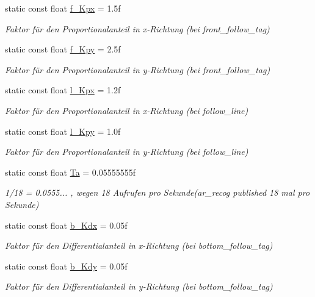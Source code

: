 \begin{DoxyCompactItemize}
static const float \hyperlink{class_cglobal_ae94b927d5fee8ac20eb04add78006959}{f\_\-Kpx} = 1.5f
\begin{DoxyCompactList}\small\item\em Faktor für den Proportionalanteil in x-\/Richtung (bei front\_\-follow\_\-tag) \end{DoxyCompactList}\item 
static const float \hyperlink{class_cglobal_a06a9f451633a82b68760360037b53f64}{f\_\-Kpy} = 2.5f
\begin{DoxyCompactList}\small\item\em Faktor für den Proportionalanteil in y-\/Richtung (bei front\_\-follow\_\-tag) \end{DoxyCompactList}\item 
static const float \hyperlink{class_cglobal_a6c5a5a9fb3c2da5264622c738b326245}{l\_\-Kpx} = 1.2f
\begin{DoxyCompactList}\small\item\em Faktor für den Proportionalanteil in x-\/Richtung (bei follow\_\-line) \end{DoxyCompactList}\item 
static const float \hyperlink{class_cglobal_a458383235afe73b333a22a5edcc3eed6}{l\_\-Kpy} = 1.0f
\begin{DoxyCompactList}\small\item\em Faktor für den Proportionalanteil in y-\/Richtung (bei follow\_\-line) \end{DoxyCompactList}\item 
static const float \hyperlink{class_cglobal_a7a599bd2c2f4400e3b7f8f98e1f293fe}{Ta} = 0.05555555f
\begin{DoxyCompactList}\small\item\em 1/18 = 0.0555... , wegen 18 Aufrufen pro Sekunde(ar\_\-recog published 18 mal pro Sekunde) \end{DoxyCompactList}\item 
static const float \hyperlink{class_cglobal_a78bc2eecbfcfe436e141e9e06b7d6f10}{b\_\-Kdx} = 0.05f
\begin{DoxyCompactList}\small\item\em Faktor für den Differentialanteil in x-\/Richtung (bei bottom\_\-follow\_\-tag) \end{DoxyCompactList}\item 
static const float \hyperlink{class_cglobal_a96f46cc71bfa56cf87b9a0e974b8271c}{b\_\-Kdy} = 0.05f
\begin{DoxyCompactList}\small\item\em Faktor für den Differentialanteil in y-\/Richtung (bei bottom\_\-follow\_\-tag) \end{DoxyCompactList}\item 

\end{DoxyCompactItemize}
